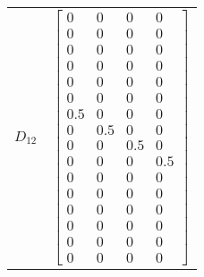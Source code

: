 \begin{tabular}{cl}
 $D_{12}$ & $\left[\begin{matrix}0 & 0 & 0 & 0\\0 & 0 & 0 & 0\\0 & 0 & 0 & 0\\0 & 0 & 0 & 0\\0 & 0 & 0 & 0\\0 & 0 & 0 & 0\\0.5 & 0 & 0 & 0\\0 & 0.5 & 0 & 0\\0 & 0 & 0.5 & 0\\0 & 0 & 0 & 0.5\\0 & 0 & 0 & 0\\0 & 0 & 0 & 0\\0 & 0 & 0 & 0\\0 & 0 & 0 & 0\\0 & 0 & 0 & 0\\0 & 0 & 0 & 0\end{matrix}\right]$                                                                                                                                                                                                                                                                                                                                                                                                                                                                                                                                                                                                                                                                                                                                                                                                                                                                                                                                                                                                                                                                                                                                                                                                                                                                                                                                                                                                                                                                                                                                                                                                                                                                                                                                                                                                                                                                                                                                                                                  \\

\end{tabular}
